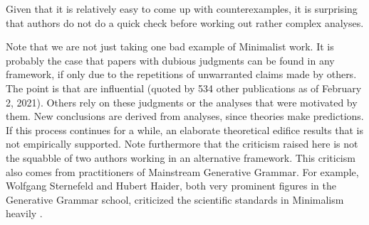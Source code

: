 \documentclass[output=paper,biblatex,babelshorthands,newtxmath,draftmode,colorlinks,citecolor=brown]{langscibook}
\begin{document}
\zl
%
Given that it is relatively easy to come up with counterexamples, it is surprising that authors do
not do a quick check before working out rather complex analyses.

Note that we are not just taking one bad example of Minimalist work. It is probably the case that
papers with dubious judgments can be found in any framework, if only due to the repetitions
of unwarranted claims made by others. The point is that \citeauthor{AL2003a-u} are influential 
(quoted by 534 other publications as of February 2, 2021). 
Others rely on these judgments or the analyses that were
motivated by them. New conclusions are derived from analyses, since theories make predictions. If
this process continues for a while, an elaborate theoretical edifice results that is not
empirically supported. Note furthermore that the criticism raised here is not the squabble of two
authors working in an alternative framework. This criticism also comes from practitioners of
Mainstream Generative Grammar. For example, Wolfgang Sternefeld and Hubert Haider, both very
prominent figures in the  Generative Grammar school, criticized the scientific standards in
Minimalism heavily \citep{%
SR2012a,Haider2018a}. 
\end{document}
